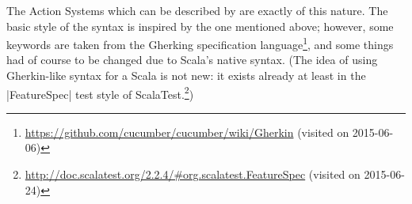 The Action Systems which can be described by \actium{} are exactly of this nature. The basic style
of the syntax is inspired by the one mentioned above; however, some keywords are taken from the
Gherking specification
language\footnote{\protect\url{https://github.com/cucumber/cucumber/wiki/Gherkin} (visited on
  2015-06-06)}, and some things had of course to be changed due to Scala's native syntax. (The idea
of using Gherkin-like syntax for a Scala \dsl{} is not new: it exists already at least in the
|FeatureSpec| test style of
ScalaTest.\footnote{\protect\url{http://doc.scalatest.org/2.2.4/\#org.scalatest.FeatureSpec}
  (visited on 2015-06-24)})%


